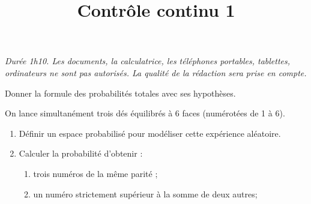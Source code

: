 \documentclass[a4paper]{tp_um}
\title{\large \sffamily\bfseries Contrôle continu 1}
\begin{document}
\maketitle
\textit{Durée 1h10. Les documents, la calculatrice, les téléphones portables, tablettes, ordinateurs ne sont pas autorisés. La qualité de la rédaction sera prise en compte.} 

\bigskip
\bigskip

 Donner la formule des probabilités totales avec ses hypothèses.
\vspace*{8cm}


\exo{} On lance simultanément trois dés équilibrés à 6 faces (numérotées de 1 à 6).
\begin{enumerate}
    \item Définir un espace probabilisé pour modéliser cette expérience aléatoire.
        \vspace*{5cm}



    \item Calculer la probabilité d'obtenir :
        \begin{enumerate}
            \item trois numéros de la même parité ;
        \newpage

        \vspace*{3cm}

            \item un numéro strictement supérieur à la somme de deux autres;
       \vspace*{15cm}\newpage


\end{enumerate}
\end{enumerate}
\end{document}
